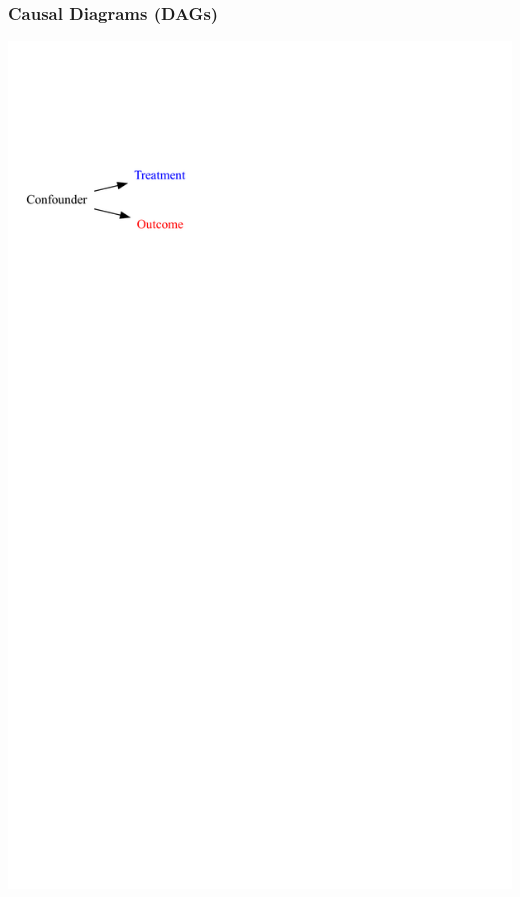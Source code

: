 \documentclass[xcolor=x11names,compress]{beamer}\usepackage[]{graphicx}\usepackage[]{color}
\newenvironment{knitrout}{}{} %
\renewcommand{\(}{\begin{columns}}
\renewcommand{\)}{\end{columns}}
\newcommand{\<}[1]{\begin{column}{#1}}
\renewcommand{\>}{\end{column}}
\begin{document}
\begin{frame}
\frametitle{Causal Diagrams (DAGs)}
\begin{knitrout}
\color{fgcolor}
\includegraphics[width=1.4\linewidth]{figure/Dag2_a-1} 

\end{knitrout}
\end{frame}
\end{document}

